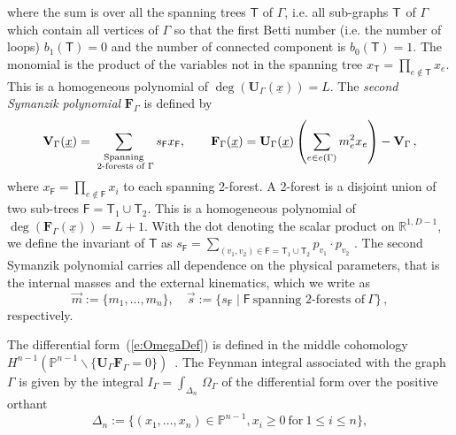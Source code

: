 \documentclass[a4paper,12pt]{article}
\numberwithin{equation}{section}
\numberwithin{figure}{section}
\begin{document}
where the sum is over all the spanning trees $\mathsf{T}$ of $\Gamma$,  i.e.  all sub-graphs ${\sf T}$ of $\Gamma$ which contain all
vertices of $\Gamma$ so that the first Betti number (i.e. the number
of loops) $b_1(\mathsf{T}) =0$ and the number of connected component
is 
$b_0(\mathsf{T})=1$. The
monomial is the product of the variables not in the spanning tree
$x_{\mathsf{T}} = \prod_{e\notin {\mathsf{T}}} x_e$.  This is a
homogeneous polynomial of 
$\deg(\textbf{U}_\Gamma(\underline x))=L$.
The {\em second 
	Symanzik polynomial}  $\textbf{F}_\Gamma$ is defined by
\begin{equation}\label{e:VFdef}
	{\bf V}_{\Gamma} (\underline x)= \sum_{\substack{ \text{Spanning} \\ \text{ 2-forests
				of } \Gamma}}s_{\mathsf{F}} x_{\mathsf{F}}
	,\qquad {\bf F}_{\Gamma}(\underline x) = {\bf
		U}_\Gamma(\underline x)\left( \sum_{e \in e(\Gamma)} m_e^2 x_e\right) - {\bf V}_{\Gamma}\,,
\end{equation}
where $x_{\mathsf{F}} =
\prod_{e \notin \mathsf{F}} x_i$ to each spanning 2-forest. A 2-forest
is a disjoint union of two sub-trees $\mathsf{F}=\mathsf{T}_1\cup \mathsf{T}_2$. 
This is a homogeneous polynomial of  
$\deg(\textbf{F}_\Gamma(\underline x))=L+1$.
With the dot denoting the scalar product on $\mathbb R^{1,D-1}$,  we define the invariant of $\mathsf T$ as $s_\mathsf{F} = \sum_{(v_1,v_2) \in \mathsf{F}=\mathsf{T}_1\cup \mathsf{T}_2} p_{v_1}\cdot p_{v_2}$ .
The second Symanzik polynomial carries all dependence on the physical parameters, that is 
the
internal masses and the external kinematics, which we  write as 
\begin{equation}
	\vec m:=\{m_1,\dots,m_n\}, \quad  \vec s:=\{s_\textsf{F} \mid \textsf{F} ~ \textrm{spanning
		2-forests of}~\Gamma\}\, ,	
\end{equation}
respectively.



The differential form~(\ref{e:OmegaDef}) is defined in the middle cohomology $H^{n-1}(\mathbb P^{n-1}\backslash
\{\textbf{U}_\Gamma \textbf{F}_\Gamma=0\})$~\cite{bek,Brown:2009ta}.
The Feynman integral associated with the graph $\Gamma$ is 
given by the integral $  I_\Gamma = \int_{\Delta_n}
\, \Omega_\Gamma$ of the  differential form over
the positive orthant
\begin{equation}\label{e:Deltan}
	\Delta_n:=\{(x_1,\dots,x_n)\in \mathbb P^{n-1}, x_i \geq0 ~\textrm{for}~ 1\leq
	i\leq n\},
\end{equation}
\end{document}
